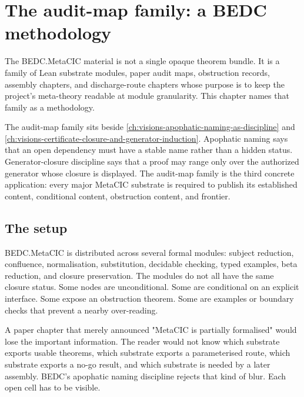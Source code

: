 \chapter{The audit-map family: a BEDC methodology}
\label{ch:audit-map-family-methodology}

The BEDC.MetaCIC material is not a single opaque theorem bundle. It is a
family of Lean substrate modules, paper audit maps, obstruction records,
assembly chapters, and discharge-route chapters whose purpose is to keep the
project's meta-theory readable at module granularity. This chapter names that
family as a methodology.



The audit-map family sits beside
\autoref{ch:visions-apophatic-naming-as-discipline} and
\autoref{ch:visions-certificate-closure-and-generator-induction}. Apophatic
naming says that an open dependency must have a stable name rather than a
hidden status. Generator-closure discipline says that a proof may range only
over the authorized generator whose closure is displayed. The audit-map family
is the third concrete application: every major MetaCIC substrate is required to
publish its established content, conditional content, obstruction content, and
frontier.

\section{The setup}
\label{sec:audit-map-family-setup}

BEDC.MetaCIC is distributed across several formal modules: subject reduction,
confluence, normalisation, substitution, decidable checking, typed examples,
beta reduction, and closure preservation. The modules do not all have the same
closure status. Some nodes are unconditional. Some are conditional on an
explicit interface. Some expose an obstruction theorem. Some are examples or
boundary checks that prevent a nearby over-reading.

A paper chapter that merely announced "MetaCIC is partially formalised" would
lose the important information. The reader would not know which substrate
exports usable theorems, which substrate exports a parameterised route, which
substrate exports a no-go result, and which substrate is needed by a later
assembly. BEDC's apophatic naming discipline rejects that kind of blur. Each
open cell has to be visible.

